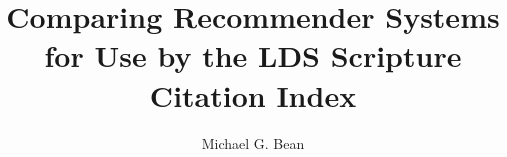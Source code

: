 \documentclass[12pt]{report}
\begin{document}
\title{Comparing Recommender Systems for Use by the LDS Scripture Citation Index}
\author{Michael G. Bean}

\showBYUHeader



%
%
%
%
%
%










%
%

\end{document}
